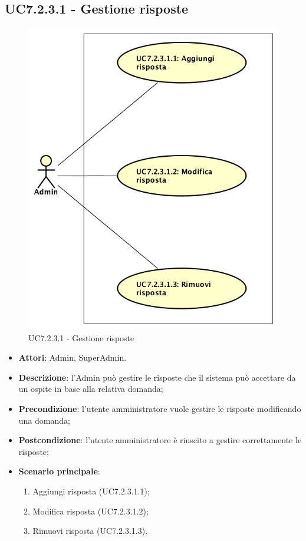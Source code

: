 \documentclass[../AnalisiDeiRequisiti_v3.0.0.tex]{subfiles}
\begin{document}
\subsection{UC7.2.3.1 - Gestione risposte} 
\label{sssec:UC7.2.3.1} 
\begin{figure}[!h]
	\centering
	\includegraphics[scale=0.7]{UseCases/UC7_GestionePannelloAdmin/UC7_2_GestioneDomande/UC7_2_3_ModificaDomanda/UC7_2_3_1_GestioneRisposte/UC7_2_3_1_GestioneRisposte.png}
	\caption{UC7.2.3.1 - Gestione risposte}
\end{figure}
\begin{itemize} 
\item \textbf{Attori}: Admin, SuperAdmin.
\item \textbf{Descrizione}: l'Admin può gestire le risposte che il sistema può accettare da un ospite in base alla relativa domanda;
\item \textbf{Precondizione}: l'utente amministratore vuole gestire le risposte modificando una domanda;
\item \textbf{Postcondizione}: l'utente amministratore è riuscito a gestire correttamente le risposte;
\item \textbf{Scenario principale}: \begin{enumerate}\item Aggiungi risposta (UC7.2.3.1.1);\item Modifica risposta (UC7.2.3.1.2);\item Rimuovi risposta (UC7.2.3.1.3).
 \end{enumerate}
\end{itemize} 
\newpage
\end{document}

